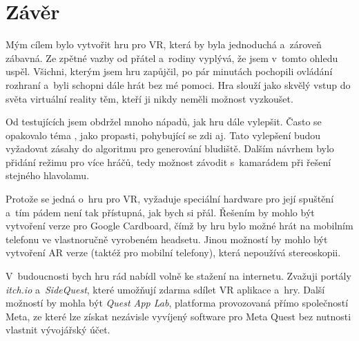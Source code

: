 \chapter*{Závěr}

Mým cílem bylo vytvořit hru pro VR, která by byla jednoduchá a~zároveň zábavná. Ze zpětné vazby od přátel a~rodiny vyplývá, že jsem v~tomto ohledu uspěl. Všichni, kterým jsem hru zapůjčil, po pár minutách pochopili ovládání rozhraní a~byli schopni dále hrát bez mé pomoci. Hra slouží jako skvělý vstup do světa virtuální reality těm, kteří ji nikdy neměli možnost vyzkoušet.

Od testujících jsem obdržel mnoho nápadů, jak hru dále vylepšit. Často se opakovalo téma , jako propasti, pohybující se zdi aj. Tato vylepšení budou vyžadovat zásahy do algoritmu pro generování bludiště. Dalším návrhem bylo přidání režimu pro více hráčů, tedy možnost závodit s~kamarádem při řešení stejného hlavolamu.

Protože se jedná o~hru pro VR, vyžaduje speciální hardware pro její spuštění a~tím pádem není tak přístupná, jak bych si přál. Řešením by mohlo být vytvoření verze pro Google Cardboard, čímž by hru bylo možné hrát na mobilním telefonu ve vlastnoručně vyrobeném headsetu. Jinou možností by mohlo být vytvoření AR verze (taktéž pro mobilní telefony), která nepoužívá stereoskopii.

V~budoucnosti bych hru rád nabídl volně ke stažení na internetu. Zvažuji portály \textit{itch.io} a~\textit{SideQuest}, které umožňují zdarma sdílet VR aplikace a~hry. Další možností by mohla být \textit{Quest App Lab}, platforma provozovaná přímo společností Meta, ze které lze získat nezávisle vyvíjený software pro Meta Quest bez nutnosti vlastnit vývojářský účet.
